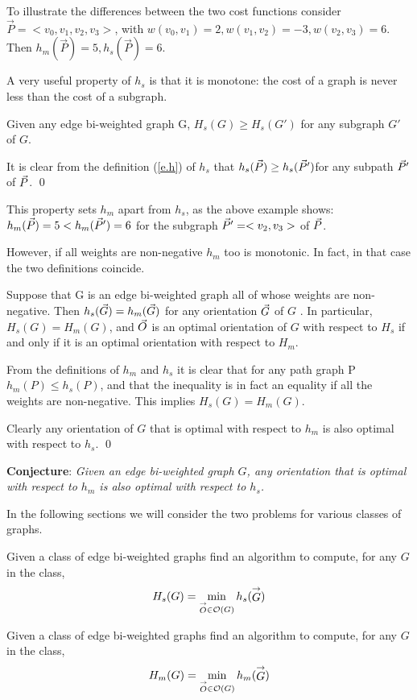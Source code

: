  To illustrate the differences between the two cost functions consider\\
 $\vec{P}=<v_0,v_1,v_2,v_3>$, with $w(v_0,v_1)=2, w(v_1,v_2)=-3,w(v_2,v_3)=6$.
 Then $h_m(\vec{P})=5, h_s(\vec{P})=6$.

A very useful property of $h_s$ is that it is monotone: the cost of a graph is never less than the cost of a subgraph.
\begin{lemma}
	Given any edge bi-weighted graph G,
	$H_{s}(G)\geq  H_{s}(G')$ for any subgraph $G'$ of $G$. 
\end{lemma}

It is clear from the definition (\ref{e.h}) of $h_s$ that $h_s(\vec{P})\geq h_s(\vec{P} ')$for any subpath 
$\vec{P} '$ of $\vec{P}$.  
\qed

This property sets $h_m$ apart from $h_s$,  as the above example shows:
$h_{m}(\vec{P})=5 <  h_{m}(\vec{P}')=6$ for the subgraph $\vec{P} '=<v_2,v_3>$ of $\vec{P}$.

However, if all weights are non-negative $h_m$ too is monotonic. In fact, in that case the two definitions coincide.

\begin{lemma}
	Suppose that G is an edge bi-weighted graph  all of whose weights are non-negative.
	Then $h_{s}( \vec{G} )= h_{m}( \vec{G} )$ for any orientation $\vec{G}$ of $G$ .
	In particular,  $H_{s}(G)= H_{m}(G)$,  and 
	$\vec{O}$ is an optimal orientation of $G$ with respect to $H_{s}$
	if and only if it is an optimal orientation with respect to $ H_{m} $.
\end{lemma}
From the definitions of $h_m$ and $h_s$ it is clear that for any path graph P  $h_{m}(P)\leq  h_{s}(P)$, and that the inequality is in fact an equality if all the weights 
are non-negative. This implies $H_{s}(G)= H_{m}(G)$.

Clearly any orientation of $G$ that is optimal with respect to $h_m$ is also 
optimal with respect to $h_s$. 
\qed

\bigskip
{\bf Conjecture}:
\textit{Given an edge bi-weighted graph $G$, any orientation that is optimal with 
	respect to $h_{m}$ is also optimal with respect to $h_{s} $.}

\bigskip
In the following sections we will consider the two problems
for various classes of graphs.

\begin{problem}
	Given a class of edge bi-weighted graphs find an algorithm to compute, for any $G$
	in the class,  
	$$
	H_s(G) = \min_{\stackrel{\rightarrow}{O} \in \mathcal{O}(G)} h_s(\stackrel{\rightarrow}{G})
	$$
\end{problem}

\begin{problem}
	Given a class of edge bi-weighted graphs find an algorithm to compute, for any $G$
	in the class,  
	$$
H_m(G) = \min_{\stackrel{\rightarrow}{O} \in \mathcal{O}(G)} h_m (\stackrel{\rightarrow}{G})
	$$
\end{problem}
